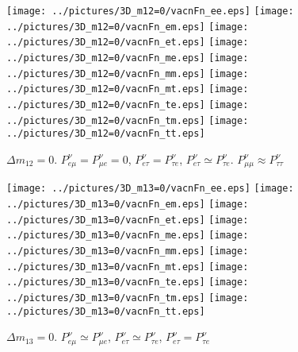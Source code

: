 \begin{figure}[!ht]
\vspace*{-0.75cm}
\texttt{[image: ../pictures/3D\_m12=0/vacnFn\_ee.eps]}\hspace*{-2mm}
\texttt{[image: ../pictures/3D\_m12=0/vacnFn\_em.eps]}\hspace*{-2mm}
\texttt{[image: ../pictures/3D\_m12=0/vacnFn\_et.eps]}\hspace*{-2mm}
\texttt{[image: ../pictures/3D\_m12=0/vacnFn\_me.eps]}\hspace*{-2mm}
\texttt{[image: ../pictures/3D\_m12=0/vacnFn\_mm.eps]}\hspace*{-2mm}
\texttt{[image: ../pictures/3D\_m12=0/vacnFn\_mt.eps]}\hspace*{-2mm}
\texttt{[image: ../pictures/3D\_m12=0/vacnFn\_te.eps]}\hspace*{-2mm}
\texttt{[image: ../pictures/3D\_m12=0/vacnFn\_tm.eps]}\hspace*{-2mm}
\texttt{[image: ../pictures/3D\_m12=0/vacnFn\_tt.eps]}
\caption{$\Delta{m_{12}}=0$. $P^{\nu}_{e\mu}=P^{\nu}_{\mu{}e}=0$, $P^{\nu}_{e\tau}=P^{\nu}_{\tau{}e}$, $P^{\nu}_{e\tau}\simeq{}P^{\nu}_{\tau{}e}$. $P^{\nu}_{\mu\mu}\approx{}P^{\nu}_{\tau\tau}$}
\label{vacn3DFn_m12=0}
\end{figure}
\begin{figure}[!ht]
\vspace*{-0.75cm}
\texttt{[image: ../pictures/3D\_m13=0/vacnFn\_ee.eps]}\hspace*{-2mm}
\texttt{[image: ../pictures/3D\_m13=0/vacnFn\_em.eps]}\hspace*{-2mm}
\texttt{[image: ../pictures/3D\_m13=0/vacnFn\_et.eps]}\hspace*{-2mm}
\texttt{[image: ../pictures/3D\_m13=0/vacnFn\_me.eps]}\hspace*{-2mm}
\texttt{[image: ../pictures/3D\_m13=0/vacnFn\_mm.eps]}\hspace*{-2mm}
\texttt{[image: ../pictures/3D\_m13=0/vacnFn\_mt.eps]}\hspace*{-2mm}
\texttt{[image: ../pictures/3D\_m13=0/vacnFn\_te.eps]}\hspace*{-2mm}
\texttt{[image: ../pictures/3D\_m13=0/vacnFn\_tm.eps]}\hspace*{-2mm}
\texttt{[image: ../pictures/3D\_m13=0/vacnFn\_tt.eps]}
\caption{$\Delta{m_{13}}=0$. $P^{\nu}_{e\mu}\simeq{}P^{\nu}_{\mu{}e}$, $P^{\nu}_{e\tau}\simeq{}P^{\nu}_{\tau{}e}$, $P^{\nu}_{e\tau}=P^{\nu}_{\tau{}e}$}
\label{vacn3DFn_m13=0}
\end{figure}
